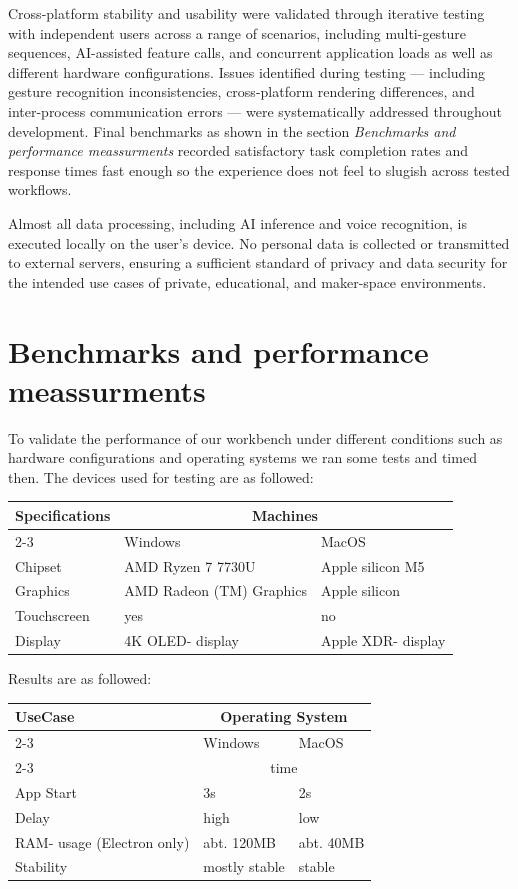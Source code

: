 \documentclass[a4paper,12pt]{article}
\begin{document}
Cross-platform stability and usability were validated through iterative testing with independent users across a range of scenarios, including multi-gesture sequences, AI-assisted feature calls, and concurrent application loads as well as different hardware configurations. Issues identified during testing — including gesture recognition inconsistencies, cross-platform rendering differences, and inter-process communication errors — were systematically addressed throughout development. Final benchmarks as shown in the section \textit{Benchmarks and performance meassurments} recorded satisfactory task completion rates and response times fast enough so the experience does not feel to slugish across tested workflows.

Almost all data processing, including AI inference and voice recognition, is executed locally on the user's device. No personal data is collected or transmitted to external servers, ensuring a sufficient standard of privacy and data security for the intended use cases of private, educational, and maker-space environments.

\newpage
\section{Benchmarks and performance meassurments}
To validate the performance of our workbench under different conditions such as hardware configurations and operating systems we ran some tests and timed then. 
The devices used for testing are as followed:\newline
\noindent
\begin{tabular}{|p{4cm}|p{5cm}|p{5cm}|}
\hline
\multirow{2}{*}{\textbf{Specifications}} & \multicolumn{2}{c|}{\textbf{Machines}} \\
\cline{2-3}
& Windows & MacOS \\
\hline
Chipset & AMD Ryzen 7 7730U & Apple silicon M5 \\
\hline
Graphics & AMD Radeon (TM) Graphics & Apple silicon \\
\hline
Touchscreen & yes & no \\
\hline
Display & 4K OLED- display & Apple XDR- display\\
\hline
\end{tabular}

Results are as followed:\newline

\noindent
\begin{tabular}{|p{4cm}|p{5cm}|p{5cm}|}
\hline
\multirow{3}{*}{\textbf{UseCase}} & \multicolumn{2}{c|}{\textbf{Operating System}} \\
\cline{2-3}
 & Windows & MacOS \\
\cline{2-3}
 & \multicolumn{2}{c|}{time} \\
\hline
App Start & 3s & 2s \\
\hline
Delay & high & low \\
\hline
RAM- usage (Electron only) & abt. 120MB & abt. 40MB \\
\hline
Stability & mostly stable & stable \\
\hline
\end{tabular}
\end{document}

